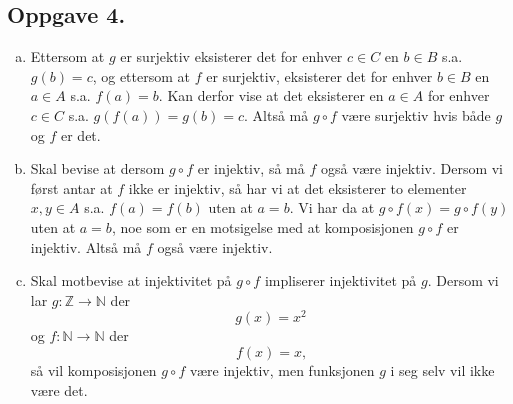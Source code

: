 \documentclass{article}
\begin{document}
\subsection*{Oppgave 4.}
\begin{enumerate}[(a)]
	\item {
		Ettersom at $g$ er surjektiv eksisterer det for enhver $c \in C$ en $b \in B$ s.a. $g(b) = c$,
		og ettersom at $f$ er surjektiv, eksisterer det for enhver $b \in B$ en $a \in A$ s.a. $f(a) = b$.
		Kan derfor vise at det eksisterer en $a \in A$ for enhver $c \in C$ s.a. $g(f(a)) = g(b) = c$.
		Altså må $g \circ f$ være surjektiv hvis både $g$ og $f$ er det.
	}
	\item {
		Skal bevise at dersom $g \circ f$ er injektiv, så må $f$ også være injektiv. Dersom vi først antar at 
		$f$ ikke er injektiv, så har vi at det eksisterer to elementer $x, y \in A$ s.a. $f(a) = f(b)$ uten at 
		$a = b$. Vi har da at $g \circ f(x) = g \circ f(y)$ uten at $a = b$, noe som er en motsigelse med at komposisjonen
		$g \circ f$ er injektiv. Altså må $f$ også være injektiv.
	}
	\item {
		Skal motbevise at injektivitet på $g \circ f$ impliserer injektivitet på $g$. Dersom vi lar 
		$g : \mathbb{Z} \to \mathbb{N}$ der 
		$$g(x) = x^2$$
		og $f : \mathbb{N} \to \mathbb{N}$ der 
		$$f(x) = x\text{,}$$
		så vil komposisjonen $g \circ f$ være injektiv, men funksjonen $g$ i seg selv vil ikke være det.
	}
\end{enumerate}
\end{document}
